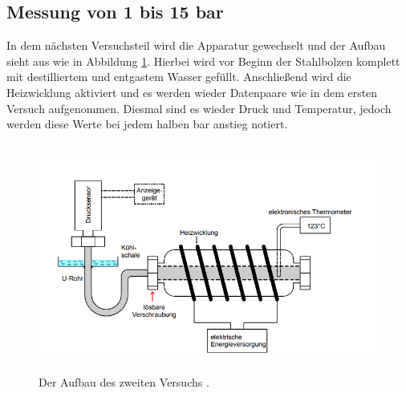 \subsection{Messung von 1 bis 15 bar}

\begin{flushleft}
    In dem nächsten Versuchsteil wird die Apparatur gewechselt und der Aufbau sieht aus wie in Abbildung \ref{Abbildung4}.
    Hierbei wird vor Beginn der Stahlbolzen komplett mit destilliertem und entgastem Wasser gefüllt.
    Anschließend wird die Heizwicklung aktiviert und es werden wieder Datenpaare wie in dem ersten Versuch aufgenommen.
    Diesmal sind es wieder Druck und Temperatur, jedoch werden diese Werte bei jedem halben bar anstieg notiert. 
\end{flushleft}

\begin{figure}[H]       
    \centering
    \includegraphics[height=75mm]{bilder/A2.png}
    \caption{Der Aufbau des zweiten Versuchs \cite{a1}. \label{Abbildung4} }
\end{figure}